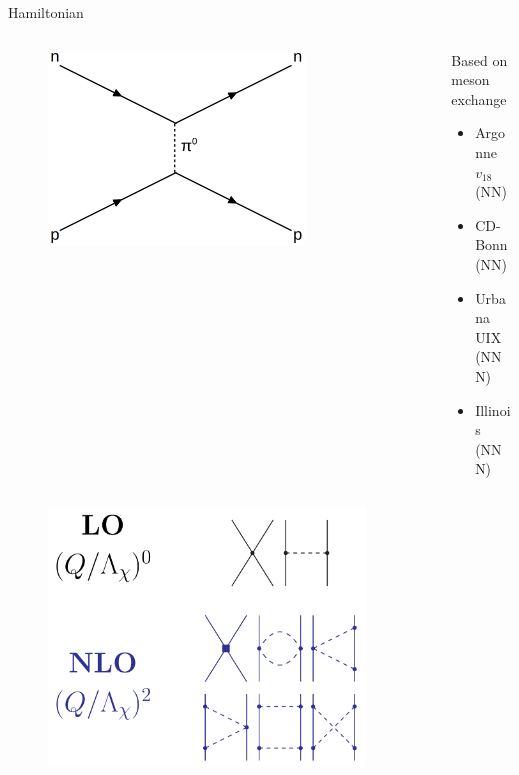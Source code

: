 \documentclass{beamer}
\begin{document}
\begin{frame}{Hamiltonian}
\begin{columns}
\begin{column}{0.5\textwidth}
\begin{figure}
   \includegraphics[width=0.75\textwidth]{../figures/pionexchange.png}
\end{figure}
\end{column}
\begin{column}{0.5\textwidth}
   Based on meson exchange
   \begin{itemize}
      \item Argonne $v_{18}$ (NN)
      \item CD-Bonn (NN)
      \item Urbana UIX (NNN)
      \item Illinois (NNN)
   \end{itemize}
\end{column}
\end{columns}
\begin{columns}
\begin{column}{0.5\textwidth}
\begin{figure}
   \includegraphics[width=0.75\textwidth]{../figures/chpt.png}

\end{figure}
\end{column}
\end{columns}
\end{frame}
\end{document}
